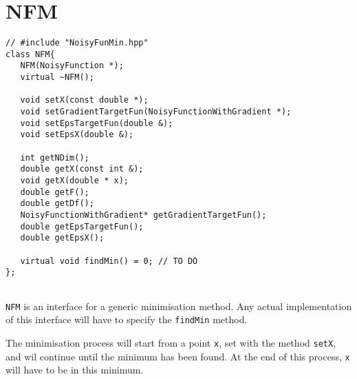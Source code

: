 \documentclass[11pt,a4paper,twoside]{article}
\begin{document}



\section{NFM} %
\label{sec:nfm}

\begin{verbatim}
// #include "NoisyFunMin.hpp"
class NFM{
   NFM(NoisyFunction *);                                       
   virtual ~NFM();
   
   void setX(const double *);
   void setGradientTargetFun(NoisyFunctionWithGradient *);          
   void setEpsTargetFun(double &); 
   void setEpsX(double &);                          
   
   int getNDim();                                         
   double getX(const int &);                    
   void getX(double * x);
   double getF();                             
   double getDf();                  
   NoisyFunctionWithGradient* getGradientTargetFun(); 
   double getEpsTargetFun();            
   double getEpsX();
   
   virtual void findMin() = 0; // TO DO
};
  
\end{verbatim}

\verb+NFM+ is an interface for a generic minimisation method.
Any actual implementation of this interface will have to specify the \verb+findMin+ method.

The minimisation process will start from a point \verb+x+, set with the method \verb+setX+, and wil continue until the minimum has been found.
At the end of this process, \verb+x+ will have to be in this minimum.
\end{document}
